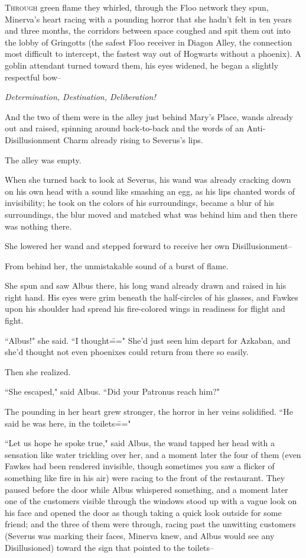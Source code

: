 
\lettrine{T}{hrough} green flame they whirled, through the Floo network they spun, Minerva's heart racing with a pounding horror that she hadn't felt in ten years and three months, the corridors between space coughed and spit them out into the lobby of Gringotts (the safest Floo receiver in Diagon Alley, the connection most difficult to intercept, the fastest way out of Hogwarts without a phoenix). A goblin attendant turned toward them, his eyes widened, he began a slightly respectful bow\---

\emph{Determination, Destination, Deliberation!}

And the two of them were in the alley just behind Mary's Place, wands already out and raised, spinning around back-to-back and the words of an Anti-Disillusionment Charm already rising to Severus's lips.

The alley was empty.

When she turned back to look at Severus, his wand was already cracking down on his own head with a sound like smashing an egg, as his lips chanted words of invisibility; he took on the colors of his surroundings, became a blur of his surroundings, the blur moved and matched what was behind him and then there was nothing there.

She lowered her wand and stepped forward to receive her own Disillusionment\---

From behind her, the unmistakable sound of a burst of flame.

She spun and saw Albus there, his long wand already drawn and raised in his right hand. His eyes were grim beneath the half-circles of his glasses, and Fawkes upon his shoulder had spread his fire-colored wings in readiness for flight and fight.

``Albus!" she said. ``I thought\===" She'd just seen him depart for Azkaban, and she'd thought not even phoenixes could return from there so easily.

Then she realized.

``She escaped," said Albus. ``Did your Patronus reach him?"

The pounding in her heart grew stronger, the horror in her veins solidified. ``He said he was here, in the toilets\==="

``Let us hope he spoke true," said Albus, the wand tapped her head with a sensation like water trickling over her, and a moment later the four of them (even Fawkes had been rendered invisible, though sometimes you saw a flicker of something like fire in his air) were racing to the front of the restaurant. They paused before the door while Albus whispered something, and a moment later one of the customers visible through the windows stood up with a vague look on his face and opened the door as though taking a quick look outside for some friend; and the three of them were through, racing past the unwitting customers (Severus was marking their faces, Minerva knew, and Albus would see any Disillusioned) toward the sign that pointed to the toilets\---

